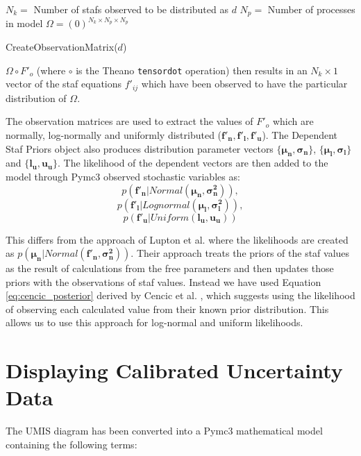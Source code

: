 \documentclass[ %
                    author={Tom Jager},
                supervisor={Dr. Daniel Schien},
                    degree={MEng},
                     title={A Bayesian Inference Engine for Calibrating Uncertainty over UMIS Structured MFA Systems},
                  subtitle={},
                      type={research},
                      year={2019} ]{dissertation}
\begin{document}
\begin{algorithm}[h!]
    $N_k =$ Number of stafs observed to be distributed as $d$\;
    $N_p =$ Number of processes in model\;
    $\Omega = (0)^{N_k \times N_p \times N_p}$\;
    \caption{CreateObservationMatrix($d$)}
    \label{alg:observation_matrix}
\end{algorithm}



$\Omega \circ F'_o$ (where $\circ$ is the Theano \texttt{tensordot} operation) then results in an $N_k \times 1$ vector of the staf equations $f'_{ij}$ which have been observed to have the particular distribution of $\Omega$.

The observation matrices are used to extract the values of $F'_o$ which are normally, log-normally and uniformly distributed ($\bm{f'_n}, \bm{f'_l}, \bm{f'_u}$). The Dependent Staf Priors object also produces distribution parameter vectors $\{\bm{\mu_n}, \bm{\sigma_n}\}$, $\{\bm{\mu_l}, \bm{\sigma_l}\}$ and $\{\bm{l_u}, \bm{u_u}\}$. The likelihood of the dependent vectors are then added to the model through Pymc3 observed stochastic variables as: 
$$ p(\bm{f'_n} | Normal(\bm{\mu_n}, \bm{\sigma_n^2})),$$
$$p(\bm{f'_l} | Lognormal(\bm{\mu_l}, \bm{\sigma_l^2})),$$
$$p(\bm{f'_u} | Uniform(\bm{l_u}, \bm{u_u})) $$

This differs from the approach of Lupton et al. where the likelihoods are created as $p(\bm{\mu_n} | Normal(\bm{f'_n}, \bm{\sigma_n^2}))$. Their approach treats the priors of the staf values as the result of calculations from the free parameters and then updates those priors with the observations of staf values. Instead we have used Equation \ref{eq:cencic_posterior} derived by Cencic et al. \cite{cencic2018data}, which suggests using the likelihood of observing each calculated value from their known prior distribution. This allows us to use this approach for log-normal and uniform likelihoods.

\section{Displaying Calibrated Uncertainty Data}
The UMIS diagram has been converted into a Pymc3 mathematical model containing the following terms:
\end{document}
